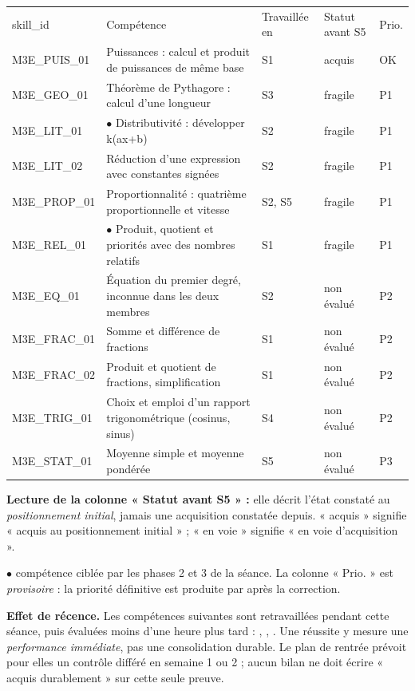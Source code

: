 \documentclass[10pt,a4paper]{article}
\begin{document}
\par\noindent\begin{tabularx}{\linewidth}{>{\ttfamily\scriptsize}p{27mm} X >{\scriptsize}p{16mm} >{\scriptsize}p{20mm} >{\scriptsize\centering\arraybackslash}p{9mm}}
\rowcolor{Navy}\color{white}\scriptsize skill\_id & \color{white}Compétence & \color{white}Travaillée en & \color{white}Statut avant S5 & \color{white}Prio. \\
M3E\_PUIS\_01 & Puissances : calcul et produit de puissances de même base & S1 & acquis & OK \\
M3E\_GEO\_01 & Théorème de Pythagore : calcul d'une longueur & S3 & fragile & P1 \\
M3E\_LIT\_01 & $\bullet$ Distributivité : développer k(ax+b) & S2 & fragile & P1 \\
M3E\_LIT\_02 & Réduction d'une expression avec constantes signées & S2 & fragile & P1 \\
M3E\_PROP\_01 & Proportionnalité : quatrième proportionnelle et vitesse & S2, S5 & fragile & P1 \\
M3E\_REL\_01 & $\bullet$ Produit, quotient et priorités avec des nombres relatifs & S1 & fragile & P1 \\
M3E\_EQ\_01 & Équation du premier degré, inconnue dans les deux membres & S2 & non évalué & P2 \\
M3E\_FRAC\_01 & Somme et différence de fractions & S1 & non évalué & P2 \\
M3E\_FRAC\_02 & Produit et quotient de fractions, simplification & S1 & non évalué & P2 \\
M3E\_TRIG\_01 & Choix et emploi d'un rapport trigonométrique (cosinus, sinus) & S4 & non évalué & P2 \\
M3E\_STAT\_01 & Moyenne simple et moyenne pondérée & S5 & non évalué & P3 \\
\end{tabularx}
\par\vspace{1mm}\small\textbf{Lecture de la colonne « Statut avant S5 » :} elle décrit l'état constaté au \emph{positionnement initial}, jamais une acquisition constatée depuis. « acquis » signifie « acquis au positionnement initial » ; « en voie » signifie « en voie d'acquisition ».
\par\small$\bullet$ compétence ciblée par les phases 2 et 3 de la séance. La colonne « Prio. » est \emph{provisoire} : la priorité définitive est produite par  après la correction.
\begin{warningbox}\textbf{Effet de récence.} Les compétences suivantes sont retravaillées pendant cette séance, puis évaluées moins d'une heure plus tard : , , . Une réussite y mesure une \emph{performance immédiate}, pas une consolidation durable. Le plan de rentrée prévoit pour elles un contrôle différé en semaine 1 ou 2 ; aucun bilan ne doit écrire « acquis durablement » sur cette seule preuve.\end{warningbox}
\end{document}
